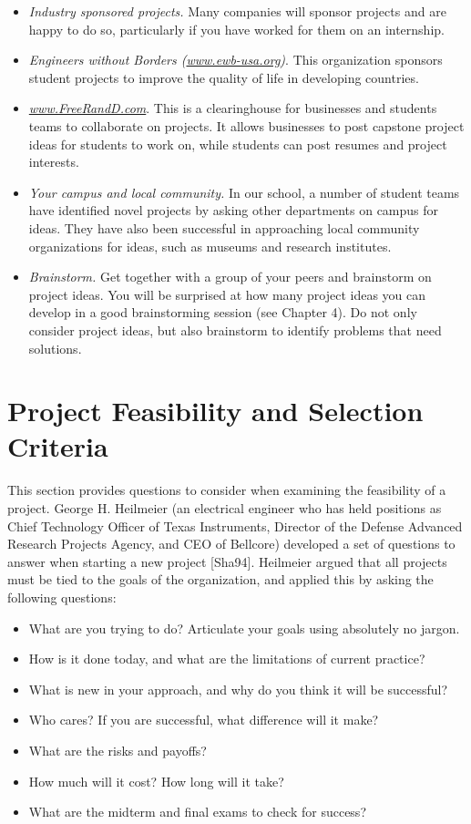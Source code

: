 \begin{itemize}
\item
  \emph{Industry sponsored projects.} Many companies will sponsor
  projects and are happy to do so, particularly if you have worked for
  them on an internship.
\item
  \emph{Engineers without Borders
  (\href{http://www.ewb-usa.org}{www.ewb-usa.org})}. This organization
  sponsors student projects to improve the quality of life in developing
  countries.
\item
  \href{http://www.FreeRandD.com}{\emph{www.FreeRandD.com}}. This is a
  clearinghouse for businesses and students teams to collaborate on
  projects. It allows businesses to post capstone project ideas for
  students to work on, while students can post resumes and project
  interests.
\item
  \emph{Your campus and local community.} In our school, a number of
  student teams have identified novel projects by asking other
  departments on campus for ideas. They have also been successful in
  approaching local community organizations for ideas, such as museums
  and research institutes.
\item
  \emph{Brainstorm.} Get together with a group of your peers and
  brainstorm on project ideas. You will be surprised at how many project
  ideas you can develop in a good brainstorming session (see Chapter 4).
  Do not only consider project ideas, but also brainstorm to identify
  problems that need solutions.
\end{itemize}

\section{Project Feasibility and Selection Criteria}
\label{section:project-feasibility-and-selection-criteria}
This section provides questions to consider when examining the
feasibility of a project. George H. Heilmeier (an electrical engineer
who has held positions as Chief Technology Officer of Texas Instruments,
Director of the Defense Advanced Research Projects Agency, and CEO of
Bellcore) developed a set of questions to answer when starting a new
project {[}Sha94{]}. Heilmeier argued that all projects must be tied to
the goals of the organization, and applied this by asking the following
questions:

\begin{itemize}
\item
  What are you trying to do? Articulate your goals using absolutely no
  jargon.
\item
  How is it done today, and what are the limitations of current
  practice?
\item
  What is new in your approach, and why do you think it will be
  successful?
\item
  Who cares? If you are successful, what difference will it make?
\item
  What are the risks and payoffs?
\item
  How much will it cost? How long will it take?
\item
  What are the midterm and final exams to check for success?
\end{itemize}

